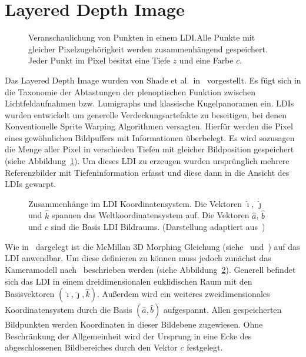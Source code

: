 \documentclass[hyperref, beleg, german]{cgvpub}
\begin{document}
\section{Layered Depth Image}

\begin{figure}
	\centering
	
	\caption{Veranschaulichung von Punkten in einem LDI.\@ Alle Punkte mit
	gleicher Pixelzugehörigkeit werden zusammenhängend gespeichert. Jeder
	Punkt im Pixel besitzt eine Tiefe \(z\) und eine Farbe \(c\).}%
	\label{fig:layereddepthimage}
\end{figure}

Das Layered Depth Image wurden von Shade et al.\ in~\cite{he1998layered}
vorgestellt. Es fügt sich in die Taxonomie der Abtastungen der plenoptischen
Funktion zwischen Lichtfeldaufnahmen bzw. Lumigraphs und klassische
Kugelpanoramen ein. LDIs wurden entwickelt um generelle Verdeckungsartefakte zu
beseitigen, bei denen Konventionelle Sprite Warping Algorithmen versagten.
Hierfür werden die Pixel eines gewöhnlichen Bildpuffers mit Informationen
überbelegt. Es wird sozusagen die Menge aller Pixel in verschieden Tiefen mit
gleicher Bildposition gespeichert (siehe
Abbildung~\ref{fig:layereddepthimage}). Um dieses LDI zu erzeugen wurden
ursprünglich mehrere Referenzbilder mit Tiefeninformation erfasst und diese
dann in die Ansicht des LDIs gewarpt.

\begin{figure}
	\centering
	
	\caption{Zusammenhänge im LDI Koordinatensystem. Die Vektoren \( \hat{\imath}
	\), \( \hat{\jmath} \) und \( \hat{k} \) spannen das Weltkoordinatensystem
	auf. Die Vektoren \( \hat{a} \), \( \hat{b} \) und \(c\) sind die Basis LDI
	Bildraums. (Darstellung adaptiert aus~\cite{mcmillan1997image})}%
	\label{fig:ldicoord}
\end{figure}

Wie in~\cite{chang1999ldi} dargelegt ist die McMillan 3D Morphing Gleichung
(siehe~\cite{mcmillan1995list} und~\cite{mcmillan1995plenoptic}) auf das LDI
anwendbar. Um diese definieren zu können muss jedoch zunächst das Kameramodell
nach~\cite{mcmillan1997image} beschrieben werden (siehe
Abbildung~\ref{fig:ldicoord}). Generell befindet sich das LDI in einem
dreidimensionalen euklidischen Raum mit den Basisvektoren \( (\hat{\imath},
\hat{\jmath}, \hat{k}) \). Außerdem wird ein weiteres zweidimensionales
Koordinatensystem durch die Basis \( (\hat{a}, \hat{b}) \) aufgespannt. Allen
gespeicherten Bildpunkten werden Koordinaten in dieser Bildebene zugewiesen.
Ohne Beschränkung der Allgemeinheit wird der Ursprung in eine Ecke des
abgeschlossenen Bildbereiches durch den Vektor \( c \) festgelegt.
\end{document}
